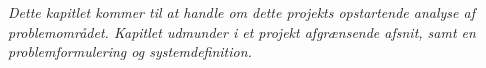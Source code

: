 \textit{Dette kapitlet kommer til at handle om dette projekts opstartende analyse af problemområdet. Kapitlet udmunder i et projekt afgrænsende afsnit, samt en problemformulering og systemdefinition.}
